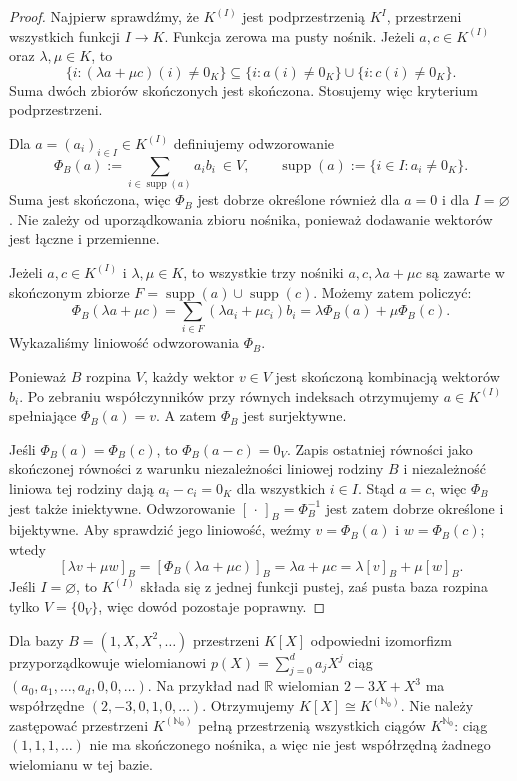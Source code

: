 \begin{proof}
Najpierw sprawdźmy, że \(K^{(I)}\) jest
podprzestrzenią \(K^I\), przestrzeni wszystkich
funkcji \(I\to K\). Funkcja zerowa ma pusty nośnik.
Jeżeli \(a,c\in K^{(I)}\) oraz
\(\lambda,\mu\in K\), to
\[
 \{i:(\lambda a+\mu c)(i)\neq0_K\}
 \subseteq
 \{i:a(i)\neq0_K\}\cup\{i:c(i)\neq0_K\}.
\]
Suma dwóch zbiorów skończonych jest skończona.
Stosujemy więc kryterium podprzestrzeni.

Dla \(a=(a_i)_{i\in I}\in K^{(I)}\)
definiujemy odwzorowanie
\[
 \Phi_B(a):=\sum_{i\in\operatorname{supp}(a)}a_ib_i
 \ \in V,\qquad
 \operatorname{supp}(a):=\{i\in I:a_i\neq0_K\}.
\]
Suma jest skończona, więc \(\Phi_B\)
jest dobrze określone również dla \(a=0\)
i dla \(I=\varnothing\).
Nie zależy od uporządkowania zbioru nośnika,
ponieważ dodawanie wektorów jest łączne
i przemienne.

Jeżeli \(a,c\in K^{(I)}\) i
\(\lambda,\mu\in K\), to wszystkie trzy
nośniki \(a,c,\lambda a+\mu c\)
są zawarte w skończonym zbiorze
\(F=\operatorname{supp}(a)\cup\operatorname{supp}(c)\).
Możemy zatem policzyć:
\[
 \Phi_B(\lambda a+\mu c)
 =\sum_{i\in F}(\lambda a_i+\mu c_i)b_i
 =\lambda\Phi_B(a)+\mu\Phi_B(c).
\]
Wykazaliśmy liniowość odwzorowania \(\Phi_B\).

Ponieważ \(B\) rozpina \(V\), każdy wektor
\(v\in V\) jest skończoną kombinacją
wektorów \(b_i\). Po zebraniu współczynników
przy równych indeksach otrzymujemy
\(a\in K^{(I)}\) spełniające
\(\Phi_B(a)=v\). A zatem \(\Phi_B\)
jest surjektywne.

Jeśli \(\Phi_B(a)=\Phi_B(c)\), to
\(\Phi_B(a-c)=0_V\).
Zapis ostatniej równości jako skończonej
równości z warunku niezależności
liniowej rodziny \(B\)
i niezależność liniowa tej rodziny dają
\(a_i-c_i=0_K\) dla wszystkich \(i\in I\).
Stąd \(a=c\), więc \(\Phi_B\) jest
także iniektywne.
Odwzorowanie \([\,\cdot\,]_B=\Phi_B^{-1}\)
jest zatem dobrze określone i bijektywne.
Aby sprawdzić jego liniowość, weźmy
\(v=\Phi_B(a)\) i \(w=\Phi_B(c)\);
wtedy
\[
 [\lambda v+\mu w]_B
 =[\Phi_B(\lambda a+\mu c)]_B
 =\lambda a+\mu c
 =\lambda[v]_B+\mu[w]_B.
\]
Jeśli \(I=\varnothing\), to
\(K^{(I)}\) składa się z jednej funkcji
pustej, zaś pusta baza rozpina tylko
\(V=\{0_V\}\), więc dowód pozostaje poprawny.
\end{proof}

\begin{przyklad}
\label{prz:lin-wspolrzedne-hamela-wielomiany}
Dla bazy \(B=(1,X,X^2,\ldots)\)
przestrzeni \(K[X]\) odpowiedni izomorfizm
przyporządkowuje wielomianowi
\(p(X)=\sum_{j=0}^{d}a_jX^j\)
ciąg \((a_0,a_1,\ldots,a_d,0,0,\ldots)\).
Na przykład nad \(\mathbb R\)
wielomian \(2-3X+X^3\) ma współrzędne
\((2,-3,0,1,0,\ldots)\).
Otrzymujemy
\(K[X]\cong K^{(\mathbb N_0)}\).
Nie należy zastępować przestrzeni
\(K^{(\mathbb N_0)}\) pełną przestrzenią
wszystkich ciągów \(K^{\mathbb N_0}\):
ciąg \((1,1,1,\ldots)\) nie ma skończonego
nośnika, a więc nie jest współrzędną
żadnego wielomianu w tej bazie.
\end{przyklad}

